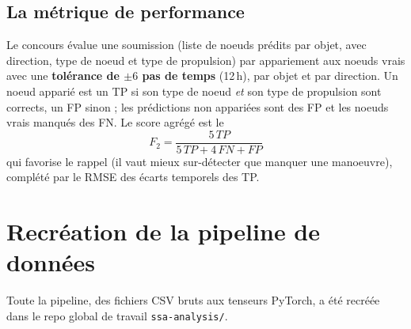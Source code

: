 \documentclass{article}
\begin{document}
\vspace{0.3cm}
\noindent{}
\vspace{0.3cm}

\subsection{La métrique de performance}

Le concours évalue une soumission (liste de noeuds prédits par objet, avec direction, type de noeud et type de propulsion) par appariement aux noeuds vrais avec une \textbf{tolérance de $\pm 6$ pas de temps} (12\,h), par objet et par direction. Un noeud apparié est un TP si son type de noeud \emph{et} son type de propulsion sont corrects, un FP sinon ; les prédictions non appariées sont des FP et les noeuds vrais manqués des FN. Le score agrégé est le
$$
F_2 = \dfrac{5\,TP}{5\,TP + 4\,FN + FP}
$$
qui favorise le rappel (il vaut mieux sur-détecter que manquer une manoeuvre), complété par le RMSE des écarts temporels des TP.


\section{Recréation de la pipeline de données}

Toute la pipeline, des fichiers CSV bruts aux tenseurs PyTorch, a été recréée dans le repo global de travail \texttt{ssa-analysis/}.
\end{document}
